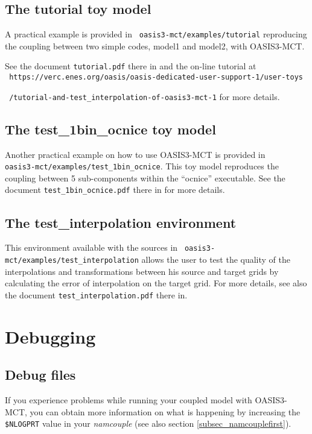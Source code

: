 \subsection{The tutorial toy model}
\label{subsec_tutorial}

A practical example  is provided in {\tt
  oasis3-mct/examples/tutorial} reproducing the coupling between two
simple codes, model1 and model2, with OASIS3-MCT. 

See
the document {\tt tutorial.pdf} there in and the on-line
tutorial at \\
{\tt
  https://verc.enes.org/oasis/oasis-dedicated-user-support-1/user-toys}

{\tt
 /tutorial-and-test\_interpolation-of-oasis3-mct-1}
for more details.

\subsection{The test\_1bin\_ocnice toy model}
\label{subsec_1bin_ocnice}

Another practical example on how to use OASIS3-MCT is provided in \\ {\tt oasis3-mct/examples/test\_1bin\_ocnice}. 
This toy model reproduces the coupling between 5 sub-components within
the “ocnice” executable. See
the document {\tt test\_1bin\_ocnice.pdf} there in for more details.

\subsection{The test\_interpolation environment}
\label{subsec_testinterpolation}

This environment available with the sources in {\tt
  oasis3-mct/examples/test\_interpolation} allows the user to test the
quality of the interpolations and transformations between his source
and target grids by calculating the error of interpolation on the
target grid. For more details, see also the document {\tt test\_interpolation.pdf} there in.

\section{Debugging}
\label{subsec_debug}

\subsection{Debug files}
If you experience problems while running your coupled model with
OASIS3-MCT, you can obtain more information on what is happening by
increasing the {\tt \$NLOGPRT} value in your {\it namcouple} (see also section
\ref{subsec_namcouplefirst}).

